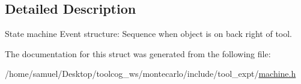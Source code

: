 \subsection{Detailed Description}
State machine Event structure\+: Sequence when object is on back right of tool. 

The documentation for this struct was generated from the following file\+:\begin{DoxyCompactItemize}
\item 
/home/samuel/\+Desktop/toolcog\+\_\+ws/montecarlo/include/tool\+\_\+expt/\hyperlink{machine_8h}{machine.\+h}\end{DoxyCompactItemize}
